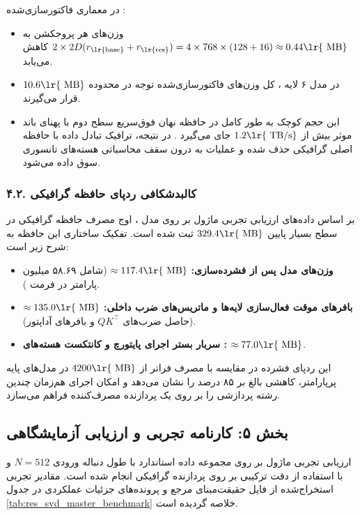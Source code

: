 در معماری فاکتورسازی‌شده :
\begin{itemize}
    \item وزن‌های هر پروجکشن به $2 \times 2 D (r_{\text{\lr{base}}} + r_{\text{\lr{res}}}) = 4 \times 768 \times (128 + 16) \approx 0.44 \text{\lr{ MB}}$ کاهش می‌یابد.
    \item در مدل ۶ لایه ، کل وزن‌های فاکتورسازی‌شده توجه در محدوده $10.6 \text{\lr{ MB}}$ قرار می‌گیرند.
    \item این حجم کوچک به طور کامل در حافظه نهان فوق‌سریع سطح دوم  با پهنای باند موثر بیش از $1.2 \text{\lr{ TB/s}}$ جای می‌گیرد . در نتیجه، ترافیک تبادل داده با حافظه اصلی گرافیکی  حذف شده و عملیات به درون سقف محاسباتی هسته‌های تانسوری  سوق داده می‌شود.
\end{itemize}

\subsubsection*{۴.۲. کالبدشکافی ردپای حافظه گرافیکی }
بر اساس داده‌های ارزیابی تجربی ماژول  بر روی مدل ، اوج مصرف حافظه گرافیکی در سطح بسیار پایین $329.4 \text{\lr{ MB}}$ ثبت شده است. تفکیک ساختاری این حافظه به شرح زیر است:
\begin{itemize}
    \item \textbf{وزن‌های مدل پس از فشرده‌سازی:} $\approx 117.4 \text{\lr{ MB}}$ (شامل ۵۸.۶۹ میلیون پارامتر در فرمت ).
    \item \textbf{بافرهای موقت فعال‌سازی لایه‌ها و ماتریس‌های ضرب داخلی:} $\approx 135.0 \text{\lr{ MB}}$ (حاصل ضرب‌های $Q K^\top$ و بافرهای آداپتور).
    \item \textbf{سربار بستر اجرای پایتورچ و کانتکست هسته‌های :} $\approx 77.0 \text{\lr{ MB}}$.
\end{itemize}
این ردپای فشرده در مقایسه با مصرف فراتر از $4200 \text{\lr{ MB}}$ در مدل‌های پایه پرپارامتر، کاهشی بالغ بر ۸۵ درصد را نشان می‌دهد و امکان اجرای هم‌زمان چندین رشته پردازشی را بر روی یک پردازنده مصرف‌کننده  فراهم می‌سازد.

\subsection*{بخش ۵: کارنامه تجربی و ارزیابی آزمایشگاهی }
ارزیابی تجربی ماژول  بر روی مجموعه داده استاندارد  با طول دنباله ورودی $N = 512$ و با استفاده از دقت ترکیبی  بر روی پردازنده گرافیکی  انجام شده است. مقادیر تجربی استخراج‌شده از فایل حقیقت‌مبنای مرجع  و پرونده‌های جزئیات عملکردی در جدول \ref{tab:res_svd_master_benchmark} خلاصه گردیده است.

